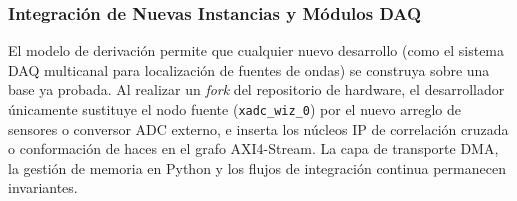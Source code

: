 \documentclass[standalone]{subfiles}
\begin{document}
\begin{table}[htbp]
\centering
\caption{Evaluación cuantitativa del factor de reutilización de código e infraestructura.}
\label{tab:reutilizacion_codigo}
\end{table}

\subsubsection{Integración de Nuevas Instancias y Módulos DAQ}
\label{subsubsec:integracion_nuevos_daq}

El modelo de derivación permite que cualquier nuevo desarrollo (como el sistema DAQ multicanal para localización de fuentes de ondas) se construya sobre una base ya probada. Al realizar un \textit{fork} del repositorio de hardware, el desarrollador únicamente sustituye el nodo fuente (\texttt{xadc\_wiz\_0}) por el nuevo arreglo de sensores o conversor ADC externo, e inserta los núcleos IP de correlación cruzada o conformación de haces en el grafo AXI4-Stream. La capa de transporte DMA, la gestión de memoria en Python y los flujos de integración continua permanecen invariantes.

\end{document}
